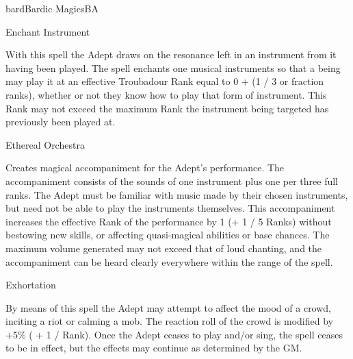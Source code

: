\begin{College}[2.1]{bard}{Bardic Magics}{BA}
\begin{spell}[G-2]{Enchant Instrument}

\begin{effects}
With this spell the Adept draws on the resonance left in an instrument
from it having been played. The spell enchants one musical instruments
so that a being may play it at an effective Troubadour Rank equal to
0 + (1 / 3 or fraction ranks), whether or not they know how to play
that form of instrument.  This Rank may not exceed the maximum Rank
the instrument being targeted has previously been played at.
\end{effects}
\end{spell}

\begin{spell}[G-3]{Ethereal Orchestra}

\begin{effects}
Creates magical accompaniment for the Adept’s performance. The
accompaniment consists of the sounds of one instrument plus one per
three full ranks. The Adept must be familiar with music made by their
chosen instruments, but need not be able to play the instruments
themselves.  This accompaniment increases the effective Rank of the
performance by 1 (+ 1 / 5 Ranks) without bestowing new skills, or
affecting quasi-magical abilities or base chances.  The maximum volume
generated may not exceed that of loud chanting, and the accompaniment
can be heard clearly everywhere within the range of the spell.
\end{effects}
\end{spell}


\begin{spell}[G-4]{Exhortation}

\begin{effects}
By means of this spell the Adept may attempt to affect the mood of a
crowd, inciting a riot or calming a mob.  The reaction roll of the
crowd is modified by +5\% ( + 1 / Rank). Once the Adept ceases to play
and/or sing, the spell ceases to be in effect, but the effects may
continue as determined by the GM.
\end{effects}
\end{spell}


\end{College}
